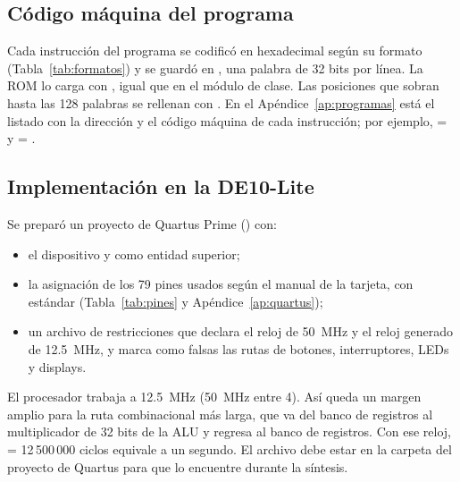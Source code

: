 \documentclass[12pt,letterpaper]{article}
\begin{document}
\subsection{Código máquina del programa}
Cada instrucción del programa se codificó en hexadecimal según su formato (Tabla~\ref{tab:formatos})
y se guardó en , una palabra de 32 bits por línea. La ROM lo carga con
, igual que  en el módulo  de clase. Las
posiciones que sobran hasta las 128 palabras se rellenan con . En el
Apéndice~\ref{ap:programas} está el listado con la dirección y el código máquina de cada
instrucción; por ejemplo,  =  y
 = .

\subsection{Implementación en la DE10-Lite}
Se preparó un proyecto de Quartus Prime () con:
\begin{itemize}[itemsep=0pt]
  \item el dispositivo  y  como entidad superior;
  \item la asignación de los 79 pines usados según el manual de la tarjeta, con estándar
         (Tabla~\ref{tab:pines} y Apéndice~\ref{ap:quartus});
  \item un archivo de restricciones  que declara el reloj de 50~MHz y el reloj
        generado de 12.5~MHz, y marca como falsas las rutas de botones, interruptores, LEDs y
        displays.
\end{itemize}
El procesador trabaja a 12.5~MHz (50~MHz entre 4). Así queda un margen amplio para la ruta
combinacional más larga, que va del banco de registros al multiplicador de 32 bits de la ALU y
regresa al banco de registros. Con ese reloj,  = 12\,500\,000 ciclos equivale a un
segundo. El archivo  debe estar en la carpeta del proyecto de Quartus
para que  lo encuentre durante la síntesis.
\end{document}
